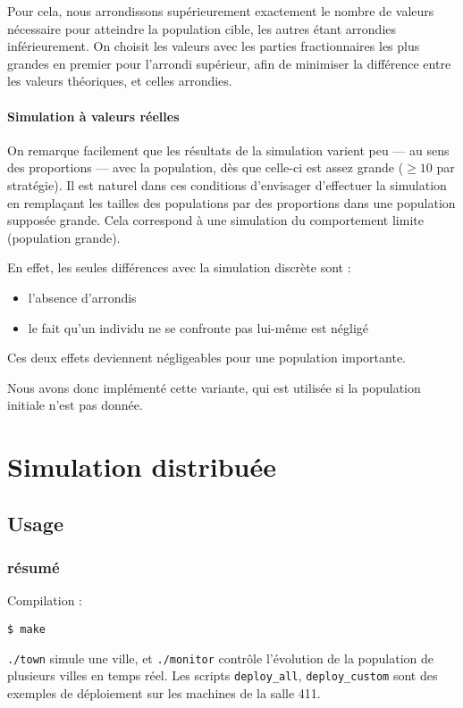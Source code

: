 \documentclass[10pt]{article}
\begin{document}
Pour cela, nous arrondissons supérieurement exactement le nombre de valeurs nécessaire pour atteindre
la population cible, les autres étant arrondies inférieurement. 
On choisit les valeurs avec les parties fractionnaires les plus grandes en premier pour l'arrondi supérieur,
afin de minimiser la différence entre les valeurs théoriques, et celles arrondies.

\paragraph{Simulation à valeurs réelles}
On remarque facilement que les résultats de la simulation varient peu --- au sens des proportions --- avec la population, dès que celle-ci
est assez grande ($\ge 10$ par stratégie).
Il est naturel dans ces conditions d'envisager d'effectuer la simulation en remplaçant les tailles des populations
par des proportions dans une population supposée grande. Cela correspond à une simulation du comportement limite (population grande).

En effet, les seules différences avec la simulation discrète sont :
\begin{itemize}
\item l'absence d'arrondis
\item le fait qu'un individu ne se confronte pas lui-même est négligé
\end{itemize}
Ces deux effets deviennent négligeables pour une population importante.

Nous avons donc implémenté cette variante, qui est utilisée si la population initiale n'est pas donnée.


\section{Simulation distribuée}
\subsection{Usage}
\subsubsection*{résumé}
Compilation :
\begin{verbatim}
$ make
\end{verbatim}

\verb|./town| simule une ville, et \verb|./monitor| contrôle l'évolution de la population de plusieurs villes en temps réel.
Les scripts \verb|deploy_all|, \verb|deploy_custom| sont des exemples de déploiement sur les machines de la salle 411.
\end{document}
